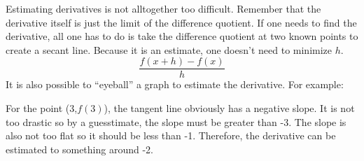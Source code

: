 \documentclass[../revisedMain.tex]{subfiles}
\begin{document}
	Estimating derivatives is not alltogether too difficult. Remember that the derivative itself is just the limit of the difference quotient. If one needs to find the derivative, all one has to do is take the difference quotient at two known points to create a secant line. Because it is an estimate, one doesn't need to minimize $h$.$$\frac{f(x+h)-f(x)}{h}$$ It is also possible to ``eyeball'' a graph to estimate the derivative. For example:
	\begin{center}
	\end{center}
	For the point (3,$f(3)$), the tangent line obviously has a negative slope. It is not too drastic so by a guesstimate, the slope must be greater than -3. The slope is also not too flat so it should be less than -1. Therefore, the derivative can be estimated to something around -2.
\end{document}

